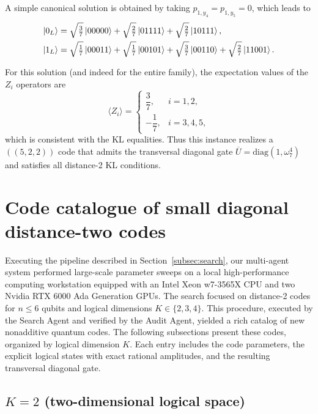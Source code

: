 \documentclass[pdflatex,sn-nature]{sn-jnl}%
\theoremstyle{thmstyleone}%
\theoremstyle{thmstyletwo}%
\theoremstyle{thmstylethree}%
\begin{document}
\begin{appendices}
A simple canonical solution is obtained by taking $p_{1, y_{4}}=p_{1, y_{5}}=0$, which leads to
\[
    \begin{aligned}
        \ket{0_L} & =\sqrt{\tfrac{3}{7}}\ket{00000}
                   +\sqrt{\tfrac{2}{7}}\ket{01111}
                   +\sqrt{\tfrac{2}{7}}\ket{10111}, \\
        \ket{1_L} & =\sqrt{\tfrac{1}{7}}\ket{00011}
                   +\sqrt{\tfrac{1}{7}}\ket{00101}
                   +\sqrt{\tfrac{3}{7}}\ket{00110}
                   +\sqrt{\tfrac{2}{7}}\ket{11001}.
    \end{aligned}
\]

For this solution (and indeed for the entire family), the expectation values of the $Z_i$ operators are
\[
    \langle Z_i\rangle=
    \begin{cases}
        \dfrac{3}{7},  & i=1,2,   \\
        -\dfrac{1}{7}, & i=3,4,5,
    \end{cases}
\]
which is consistent with the KL equalities. Thus this instance realizes a $((5,2,2))$ code that admits the transversal diagonal gate
$\overline U=\mathrm{diag}(1,\omega_7^{4})$ and satisfies all distance-2 KL conditions.

\section{Code catalogue of small diagonal distance-two codes}
\label{supp:code-catalog}

Executing the pipeline described in Section~\ref{subsec:search}, our multi-agent system performed large-scale parameter sweeps on a local high-performance computing workstation equipped with an Intel Xeon w7-3565X CPU and two Nvidia RTX 6000 Ada Generation GPUs. The search focused on distance-2 codes for $n \le 6$ qubits and logical dimensions $K \in \{2,3,4\}$. This procedure, executed by the Search Agent and verified by the Audit Agent, yielded a rich catalog of new nonadditive quantum codes. The following subsections present these codes, organized by logical dimension $K$. Each entry includes the code parameters, the explicit logical states with exact rational amplitudes, and the resulting transversal diagonal gate.

\subsection{$K=2$ (two-dimensional logical space)}


\end{appendices}
\end{document}
